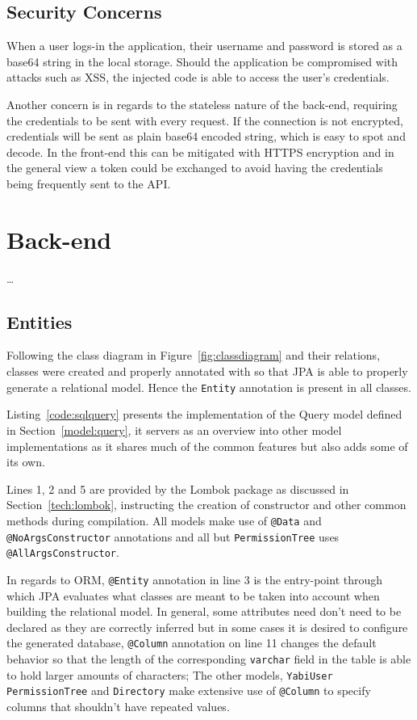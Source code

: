 \subsection{Security Concerns}

When a user logs-in the application, their username and password is stored as a base64 string in the local storage. Should the application be compromised with attacks such as \gls{XSS}, the injected code is able to access the user's credentials.

Another concern is in regards to the stateless nature of the back-end, requiring the credentials to be sent with every request. If the connection is not encrypted, credentials will be sent as plain base64 encoded string, which is easy to spot and decode. In the front-end this can be mitigated with \gls{HTTPS} encryption and in the general view a token could be exchanged to avoid having the credentials being frequently sent to the \gls{API}.

\section{Back-end}\label{cha:implementation:sec:back-end}
\dots

\subsection{Entities}
Following the class diagram in Figure~\ref{fig:classdiagram} and their relations, classes were created and properly annotated with so that \gls{JPA} is able to properly generate a relational model. Hence the \texttt{Entity} annotation is present in all classes.

Listing~\ref{code:sqlquery} presents the implementation of the Query model defined in Section~\ref{model:query}, it servers as an overview into other model implementations as it shares much of the common features but also adds some of its own.

Lines 1, 2 and 5 are provided by the Lombok package as discussed in Section~\ref{tech:lombok}, instructing the creation of constructor and other common methods during compilation. All models make use of \texttt{@Data} and \texttt{@NoArgsConstructor} annotations and all but \texttt{PermissionTree} uses \texttt{@AllArgsConstructor}.

In regards to \gls{ORM}, \texttt{@Entity} annotation in line 3 is the entry-point through which \gls{JPA} evaluates what classes are meant to be taken into account when building the relational model.
In general, some attributes need don't need to be declared as they are correctly inferred but in some cases it is desired to configure the generated database, \texttt{@Column} annotation on line 11 changes the default behavior so that the length of the corresponding \texttt{varchar} field in the table is able to hold larger amounts of characters; The other models, \texttt{YabiUser} \texttt{PermissionTree} and \texttt{Directory} make extensive use of \texttt{@Column} to specify columns that shouldn't have repeated values.

